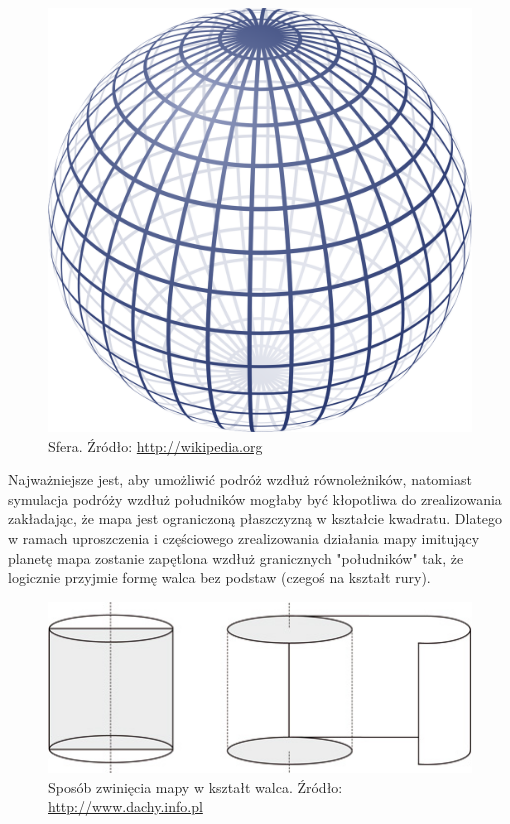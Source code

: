 \documentclass[a4paper,12pt]{article}
\begin{document}
\begin{figure}[h]
	\centering
	\includegraphics[scale=0.1]{sphere}
	\caption{Sfera. Źródło: \url{http://wikipedia.org}}
\end{figure}

Najważniejsze jest, aby umożliwić podróż wzdłuż równoleżników, natomiast symulacja podróży wzdłuż południków mogłaby być kłopotliwa do zrealizowania zakładając, że mapa jest ograniczoną płaszczyzną w kształcie kwadratu. Dlatego w ramach uproszczenia i częściowego zrealizowania działania mapy imitujący planetę mapa zostanie zapętlona wzdłuż granicznych "południków" tak, że logicznie przyjmie formę walca bez podstaw (czegoś na kształt rury).
\begin{figure}[h]
	\centering
	\includegraphics[scale=0.5]{walec}
	\caption{Sposób zwinięcia mapy w kształt walca. Źródło: \url{http://www.dachy.info.pl}}
\end{figure}
\end{document}
